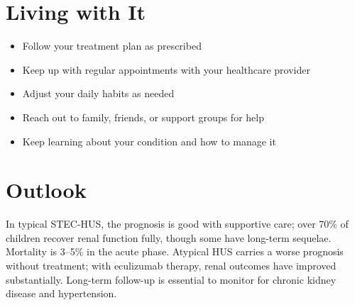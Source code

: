 \section{Living with It}

\begin{itemize}[noitemsep]
  \item Follow your treatment plan as prescribed
  \item Keep up with regular appointments with your healthcare provider
  \item Adjust your daily habits as needed
  \item Reach out to family, friends, or support groups for help
  \item Keep learning about your condition and how to manage it
\end{itemize}

\section{Outlook}
In typical STEC-HUS, the prognosis is good with supportive care; over 70\% of children recover renal function fully, though some have long-term sequelae. Mortality is 3--5\% in the acute phase. Atypical HUS carries a worse prognosis without treatment; with eculizumab therapy, renal outcomes have improved substantially. Long-term follow-up is essential to monitor for chronic kidney disease and hypertension.
